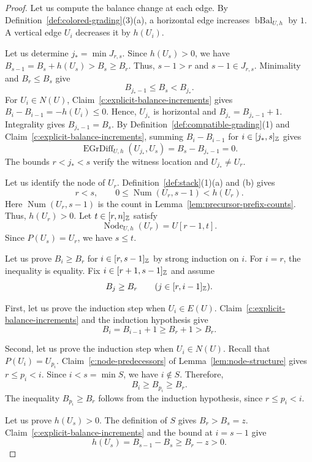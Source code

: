 \begin{proof}
 Let us compute the balance change at each edge.
By Definition~\ref{def:colored-grading}(3)(a), a horizontal edge increases $\operatorname{bBal}_{U,h}$ by $1$. A vertical edge $U_i$ decreases it by $h(U_i)$.

 Let us determine $j_*=\min J_{r,s}$.
Since $h(U_s)>0$, we have $B_{s-1}=B_s+h(U_s)>B_s\ge B_r$.
Thus, $s-1>r$ and $s-1\in J_{r,s}$.
Minimality and $B_r\le B_s$ give
\[
 B_{j_*-1}\le B_s<B_{j_*}.
\]
For $U_i\in N(U)$, Claim~\ref{c:explicit-balance-increments} gives $B_i-B_{i-1}=-h(U_i)\le0$.
Hence, $U_{j_*}$ is horizontal and $B_{j_*}=B_{j_*-1}+1$.
Integrality gives $B_{j_*-1}=B_s$.
By Definition~\ref{def:compatible-grading}(1) and Claim~\ref{c:explicit-balance-increments}, summing $B_i-B_{i-1}$ for $i\in[j_*,s]_{\mathbb Z}$ gives
\[
 \operatorname{EGrDiff}_{U,h}(U_{j_*},U_s)=B_s-B_{j_*-1}=0.
\]
The bounds $r<j_*<s$ verify the witness location and $U_{j_*}\ne U_r$.

 Let us identify the node of $U_r$.
Definition~\ref{def:stack}(1)(a) and (b) gives
\[
 r<s,\qquad 0\le \operatorname{Num}(U_r,s-1)<h(U_r).
\]
Here $\operatorname{Num}(U_r,s-1)$ is the count in Lemma~\ref{lem:precursor-prefix-counts}.
Thus, $h(U_r)>0$. Let $t\in[r,n]_{\mathbb Z}$ satisfy
\[
 \operatorname{Node}_{U,h}(U_r)=U[r-1,t].
\]
Since $P(U_s)=U_r$, we have $s\le t$.

Let us prove $B_i\ge B_r$ for $i\in[r,s-1]_{\mathbb Z}$ by strong induction on $i$.
For $i=r$, the inequality is equality.
Fix $i\in[r+1,s-1]_{\mathbb Z}$ and assume
\[
 B_j\ge B_r\qquad(j\in[r,i-1]_{\mathbb Z}).
\]

First, let us prove the induction step when $U_i\in E(U)$.
Claim~\ref{c:explicit-balance-increments} and the induction hypothesis give
\[
 B_i=B_{i-1}+1\ge B_r+1>B_r.
\]

Second, let us prove the induction step when $U_i\in N(U)$.
Recall that $P(U_i)=U_{p_i}$.
Claim~\ref{c:node-predecessors} of Lemma~\ref{lem:node-structure} gives
$r\le p_i<i$. Since $i<s=\min S$, we have $i\notin S$. Therefore,
\[
 B_i\ge B_{p_i}\ge B_r.
\]
The inequality $B_{p_i}\ge B_r$ follows from the induction hypothesis, since $r\le p_i<i$.

Let us prove $h(U_s)>0$.
The definition of $S$ gives $B_r>B_s=z$.
Claim~\ref{c:explicit-balance-increments} and the bound at $i=s-1$ give
\[
 h(U_s)=B_{s-1}-B_s\ge B_r-z>0.
\]


\end{proof}
